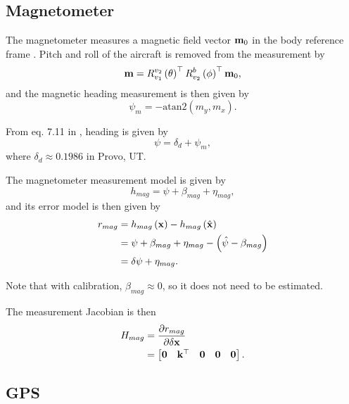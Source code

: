 \documentclass[english]{article}
\begin{document}
\subsection{Magnetometer}

The magnetometer measures a magnetic field vector ${\bf m}_0$ in the body reference frame \cite{key-3}. Pitch and roll of the aircraft is removed from the measurement by
\begin{equation}
{\bf m} = R_{v_1}^{v_2}\left(\theta\right)^\top R_{v_2}^b\left(\phi\right)^\top {\bf m}_0,
\end{equation}
and the magnetic heading measurement is then given by
\begin{equation}
\psi_m = -\mathrm{atan2} \left( m_y, m_x \right).
\end{equation}

From eq. 7.11 in \cite{key-3}, heading is given by
\begin{equation}
\psi = \delta_d + \psi_m,
\end{equation}
where $\delta_d\approx0.1986$ in Provo, UT. 

The magnetometer measurement model is given by
\begin{equation}
h_{mag} = \psi + \beta_{mag} + \eta_{mag},
\end{equation}
and its error model is then given by
\begin{align}
r_{mag} & = h_{mag}\left({\bf x}\right) - h_{mag}\left(\hat{{\bf x}}\right) \\
& = \psi + \beta_{mag} + \eta_{mag} - \left( \hat{\psi} - \beta_{mag}\right) \\
& = \delta \psi + \eta_{mag}.
\end{align}

Note that with calibration, $\beta_{mag}\approx0$, so it does not need to be estimated.

The measurement Jacobian is then
\begin{align}
H_{mag} & = \frac{\partial r_{mag}}{\partial \delta {\bf x}} \\
& = \begin{bmatrix} {\bf 0} & {\bf k}^\top & {\bf 0} & {\bf 0} & {\bf 0} \end{bmatrix}.
\end{align}

\subsection{GPS}
\end{document}
